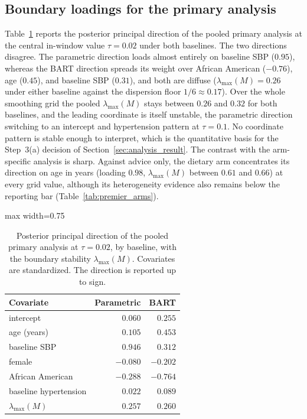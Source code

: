 \documentclass[11pt]{article}
\theoremstyle{definition}
\theoremstyle{plain}
\begin{document}
\subsection{Boundary loadings for the primary analysis}
Table~\ref{tab:premier_primary_loadings} reports the posterior principal direction of the pooled primary analysis at the central in-window value $\tau=0.02$ under both baselines. The two directions disagree. The parametric direction loads almost entirely on baseline SBP ($0.95$), whereas the BART direction spreads its weight over African American ($-0.76$), age ($0.45$), and baseline SBP ($0.31$), and both are diffuse ($\lambda_{\max}(M)=0.26$ under either baseline against the dispersion floor $1/6\approx0.17$). Over the whole smoothing grid the pooled $\lambda_{\max}(M)$ stays between $0.26$ and $0.32$ for both baselines, and the leading coordinate is itself unstable, the parametric direction switching to an intercept and hypertension pattern at $\tau=0.1$. No coordinate pattern is stable enough to interpret, which is the quantitative basis for the Step~3(a) decision of Section~\ref{sec:analysis_result}. The contrast with the arm-specific analysis is sharp. Against advice only, the dietary arm concentrates its direction on age in years (loading $0.98$, $\lambda_{\max}(M)$ between $0.61$ and $0.66$) at every grid value, although its heterogeneity evidence also remains below the reporting bar (Table~\ref{tab:premier_arms}).

\begin{table}[!htbp]
  \centering
  \caption{Posterior principal direction of the pooled primary analysis at $\tau=0.02$, by baseline, with the boundary stability $\lambda_{\max}(M)$. Covariates are standardized. The direction is reported up to sign.}
  \label{tab:premier_primary_loadings}
  \begin{adjustbox}{max width=0.75\textwidth}
  \begin{tabular}{lrr}
    \toprule
    Covariate & Parametric & BART\\
    \midrule
    intercept & $0.060$ & $0.255$\\
    age (years) & $0.105$ & $0.453$\\
    baseline SBP & $0.946$ & $0.312$\\
    female & $-0.080$ & $-0.202$\\
    African American & $-0.288$ & $-0.764$\\
    baseline hypertension & $0.022$ & $0.089$\\
    \midrule
    $\lambda_{\max}(M)$ & $0.257$ & $0.260$\\
    \bottomrule
  \end{tabular}
  \end{adjustbox}
\end{table}
\end{document}
